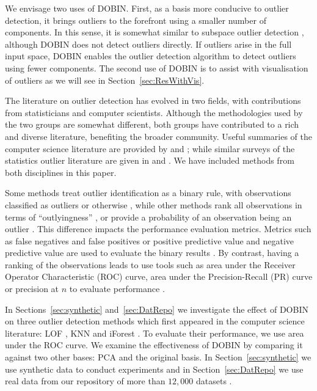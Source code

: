 \documentclass[a4paper,11pt]{article}
\begin{document}
We envisage two uses of DOBIN. First, as a basis more conducive to outlier detection, it brings outliers to the forefront using a smaller number of components. In this sense, it is somewhat similar to subspace outlier detection \citep[e.g.,][]{aggarwal2001outlier, keller2012hics}, although DOBIN does not detect outliers directly. If outliers arise in the full input space, DOBIN enables the outlier detection algorithm to detect outliers using fewer components. The second use of DOBIN is to assist with visualisation of outliers as we will see in Section~\ref{sec:ResWithVis}.

The literature on outlier detection has evolved in two fields, with contributions from statisticians and computer scientists. Although the methodologies used by the two groups are somewhat different, both groups have contributed to a rich and diverse literature, benefiting the broader community. Useful summaries of the computer science literature are provided by \citet{goldstein2016comparative} and \citet{zimek2012survey}; while similar surveys of the statistics outlier literature are given in \citet{rousseeuw2005} and \citet{unwin2019multivariate}. We have included methods from both disciplines in this paper.

Some methods treat outlier identification as a binary rule, with observations classified as outliers or otherwise \citep[e.g.,][]{billor2000bacon, wilkinson2017visualizing, rousseeuw2018detecting}, while other methods rank all observations in terms of ``outlyingness'' \citep[e.g.,][]{breunig2000lof, liu2008isolation}, or provide a probability of an observation being an outlier \citep[e.g.,][]{kriegel2009loop}. This difference impacts the performance evaluation metrics. Metrics such as false negatives and false positives or positive predictive value and negative predictive value are used to evaluate the binary results \citep{wilkinson2017visualizing}. By contrast, having a ranking of the observations leads to use tools such as area under the Receiver Operator Characteristic (ROC) curve, area under the Precision-Recall (PR) curve or precision at $n$ to evaluate performance \citep{campos2016evaluation}.

In Sections~\ref{sec:synthetic} and~\ref{sec:DatRepo} we investigate the effect of DOBIN on three outlier detection methods which first appeared in the computer science literature: LOF \citep{breunig2000lof}, KNN \citep{ramaswamy2000efficient} and iForest \citep{liu2008isolation}. To evaluate their performance, we use area under the ROC curve. We examine the effectiveness of DOBIN by comparing it against two other bases: PCA and the original basis. In Section~\ref{sec:synthetic} we use synthetic data to conduct experiments and in Section~\ref{sec:DatRepo} we use real data from our repository of more than $12,000$ datasets \citep{datasets}.
\end{document}
